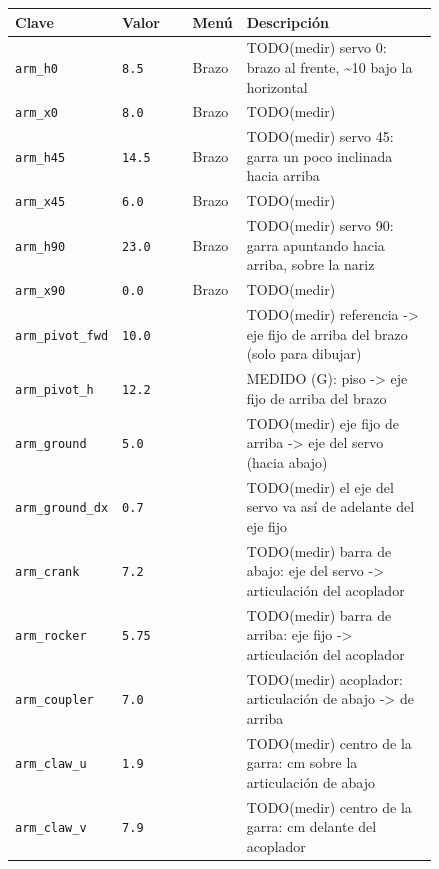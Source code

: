 \begin{longtable}{@{}p{0.2\linewidth}p{0.17\linewidth}lp{0.47\linewidth}@{}}\toprule
\textbf{Clave} & \textbf{Valor} & \textbf{Men\'u} & \textbf{Descripci\'on} \\\midrule\endhead
\texttt{arm\_\allowbreak{}h0} & \texttt{8.5} & Brazo & TODO(medir) servo 0\textdegree{}: brazo al frente, \textasciitilde{}10\textdegree{} bajo la horizontal \\
\texttt{arm\_\allowbreak{}x0} & \texttt{8.0} & Brazo & TODO(medir) \\
\texttt{arm\_\allowbreak{}h45} & \texttt{14.5} & Brazo & TODO(medir) servo 45\textdegree{}: garra un poco inclinada hacia arriba \\
\texttt{arm\_\allowbreak{}x45} & \texttt{6.0} & Brazo & TODO(medir) \\
\texttt{arm\_\allowbreak{}h90} & \texttt{23.0} & Brazo & TODO(medir) servo 90\textdegree{}: garra apuntando hacia arriba, sobre la nariz \\
\texttt{arm\_\allowbreak{}x90} & \texttt{0.0} & Brazo & TODO(medir) \\
\texttt{arm\_\allowbreak{}pivot\_\allowbreak{}fwd} & \texttt{10.0} &  & TODO(medir) referencia -> eje fijo de arriba del brazo (solo para dibujar) \\
\texttt{arm\_\allowbreak{}pivot\_\allowbreak{}h} & \texttt{12.2} &  & MEDIDO (G): piso -> eje fijo de arriba del brazo \\
\texttt{arm\_\allowbreak{}ground} & \texttt{5.0} &  & TODO(medir) eje fijo de arriba -> eje del servo (hacia abajo) \\
\texttt{arm\_\allowbreak{}ground\_\allowbreak{}dx} & \texttt{0.7} &  & TODO(medir) el eje del servo va así de adelante del eje fijo \\
\texttt{arm\_\allowbreak{}crank} & \texttt{7.2} &  & TODO(medir) barra de abajo: eje del servo -> articulación del acoplador \\
\texttt{arm\_\allowbreak{}rocker} & \texttt{5.75} &  & TODO(medir) barra de arriba: eje fijo -> articulación del acoplador \\
\texttt{arm\_\allowbreak{}coupler} & \texttt{7.0} &  & TODO(medir) acoplador: articulación de abajo -> de arriba \\
\texttt{arm\_\allowbreak{}claw\_\allowbreak{}u} & \texttt{1.9} &  & TODO(medir) centro de la garra: cm sobre la articulación de abajo \\
\texttt{arm\_\allowbreak{}claw\_\allowbreak{}v} & \texttt{7.9} &  & TODO(medir) centro de la garra: cm delante del acoplador \\

\end{longtable}
